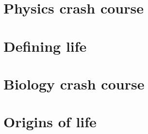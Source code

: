 \documentclass[DIV=calc, paper=a4, fontsize=12pt]{scrartcl}	 %
\begin{document}
\section{Physics crash course}

\begin{multicols}{2}








\end{multicols}

\section{Defining life}

\begin{multicols}{2}





\end{multicols}


\section{Biology crash course}

\begin{multicols}{2}



\end{multicols}


\section{Origins of life}

\begin{multicols}{2}



\end{multicols}
\end{document}
